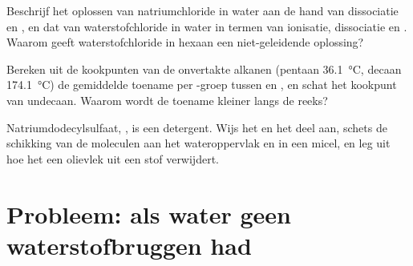 \begin{exercise}[$\star\star\star$]\label{exo:b1:intermolecular-forces-solvents:10}
Beschrijf het oplossen van natriumchloride in water aan de hand van
dissociatie en , en dat van waterstofchloride in water in
termen van ionisatie, dissociatie en . Waarom geeft
waterstofchloride in hexaan een niet-geleidende oplossing?
\end{exercise}

\begin{exercise}[$\star\star\star$]\label{exo:b1:intermolecular-forces-solvents:11}
Bereken uit de kookpunten van de onvertakte alkanen (pentaan
\qty{36.1}{\celsius}, decaan \qty{174.1}{\celsius}) de gemiddelde
toename per -groep tussen  en , en schat het
kookpunt van undecaan. Waarom wordt de toename kleiner langs de reeks?
\end{exercise}


\begin{exercise}[$\star\star\star$]\label{exo:b1:intermolecular-forces-solvents:12}
Natriumdodecylsulfaat, , is een detergent. Wijs
het  en het  deel aan, schets de schikking van de
moleculen aan het wateroppervlak en in een micel, en leg uit hoe het een
olievlek uit een stof verwijdert.
\end{exercise}

\section{Probleem: als water geen waterstofbruggen had}

